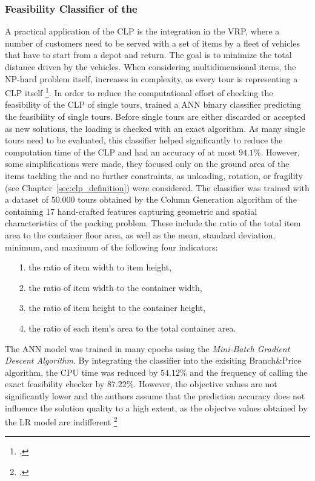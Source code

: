 \subsubsection{Feasibility Classifier of the }
A practical application of the \gls{CLP} is the integration in the \gls{VRP}, where
a number of customers need to be served with a set of items by a fleet of vehicles that have
to start from a depot and return. The goal is to minimize the total distance driven
by the vehicles. When considering multidimensional items, the NP-hard problem itself,
increases in complexity, as every tour is representing a \gls{CLP} itself \footcite[cf.][pp. 1--2]{tamke_branch-and-cut_2024}.
In order to reduce the computational effort of checking the feasibility of the \gls{CLP}
of single tours, \citeauthor*{zhang_learning-based_2022} trained a \gls{ANN} binary classifier
predicting the feasibility of single tours. Before single tours are either discarded or accepted
as new solutions, the loading is checked with an exact algorithm. As many single tours need to be evaluated,
this classifier helped significantly to reduce the computation time of the \gls{CLP} and had
an accuracy of at most $94.1\%$. However, some simplifications were made, they focused only
on the ground area of the items tackling the  and no further constraints,
as unloading, rotation, or fragility (see Chapter~\ref{sec:clp_definition}) were considered.
The classifier was trained with a dataset of $50.000$ tours obtained by the Column Generation
algorithm of the  containing 17 hand-crafted features capturing geometric
and spatial characteristics of the packing problem. These include the ratio of the total item area
to the container floor area, as well as the mean, standard deviation, minimum, and maximum of
the following four indicators:
\begin{itemize}
    \item[1.] the ratio of item width to item height,
    \item[2.] the ratio of item width to the container width,
    \item[3.] the ratio of item height to the container height,
    \item[4.] the ratio of each item’s area to the total container area.
\end{itemize}
The \gls{ANN} model was trained in many epochs
using the \textit{Mini-Batch Gradient Descent Algorithm}. By integrating the classifier into the
exisiting Branch\&Price algorithm, the CPU time was reduced by $54.12\%$ and the frequency of
calling the exact feasibility checker by $87.22\%$. However, the objective values are not significantly
lower and the authors assume that the prediction accuracy does not influence the solution quality
to a high extent, as the objectve values obtained by the \gls{LR} model are indifferent \footcite[cf.][pp. 4, 9--15]{zhang_learning-based_2022}

